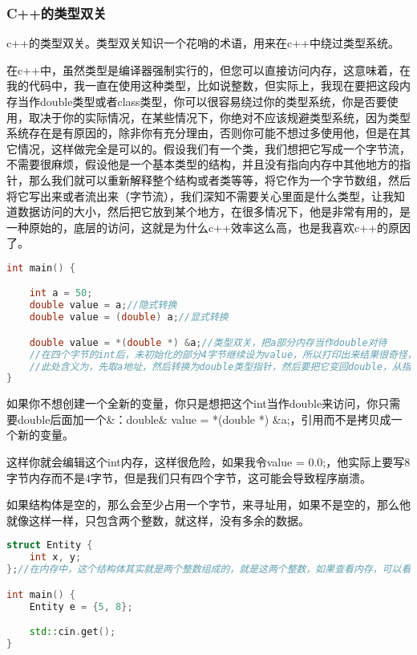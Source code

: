\subsubsection{C++的类型双关}

c++的类型双关。类型双关知识一个花哨的术语，用来在c++中绕过类型系统。

在c++中，虽然类型是编译器强制实行的，但您可以直接访问内存，这意味着，在我的代码中，我一直在使用这种类型，比如说整数，但实际上，我现在要把这段内存当作{\ncodestyle double}类型或者{\ncodestyle class}类型，你可以很容易绕过你的类型系统，你是否要使用，取决于你的实际情况，在某些情况下，你绝对不应该规避类型系统，因为类型系统存在是有原因的，除非你有充分理由，否则你可能不想过多使用他，但是在其它情况，这样做完全是可以的。假设我们有一个类，我们想把它写成一个字节流，不需要很麻烦，假设他是一个基本类型的结构，并且没有指向内存中其他地方的指针，那么我们就可以重新解释整个结构或者类等等，将它作为一个字节数组，然后将它写出来或者流出来（字节流），我们深知不需要关心里面是什么类型，让我知道数据访问的大小，然后把它放到某个地方，在很多情况下，他是非常有用的，是一种原始的，底层的访问，这就是为什么c++效率这么高，也是我喜欢c++的原因了。

\begin{lstlisting}[language=c++]
int main() {

    int a = 50;
    double value = a;//隐式转换
    double value = (double) a;//显式转换

    double value = *(double *) &a;//类型双关，把a部分内存当作double对待
    //在四个字节的int后，未初始化的部分4字节继续设为value，所以打印出来结果很奇怪，这很糟糕，某些情况下会造成崩溃
    //此处含义为，先取a地址，然后转换为double类型指针，然后要把它变回double，从指针回到实际类型，所以我们解引用*
}
\end{lstlisting}

如果你不想创建一个全新的变量，你只是想把这个{\ncodestyle int}当作{\ncodestyle double}来访问，你只需要double后面加一个{\ncodestyle \&}：{\ncodestyle double\& value = *(double *) \&a;}，引用而不是拷贝成一个新的变量。

这样你就会编辑这个{\ncodestyle int}内存，这样很危险，如果我令{\ncodestyle value = 0.0;}，他实际上要写8字节内存而不是4字节，但是我们只有四个字节，这可能会导致程序崩溃。

如果结构体是空的，那么会至少占用一个字节，来寻址用，如果不是空的，那么他就像这样一样，只包含两个整数，就这样，没有多余的数据。

\begin{lstlisting}[language=c++]
struct Entity {
    int x, y;
};//在内存中，这个结构体其实就是两个整数组成的，就是这两个整数，如果查看内存，可以看到他是两个挨着的整形

int main() {
    Entity e = {5, 8};

    std::cin.get();
}
\end{lstlisting}

